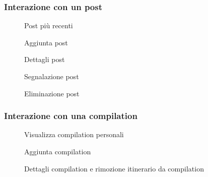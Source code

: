 \documentclass{natourDoc}
\begin{document}
\subsubsection{Interazione con un post}

\begin{figure}[!htbp]
	\centering
	
	\caption{Post più recenti}
\end{figure}
\FloatBarrier

\begin{figure}[!htbp]
	\centering
	
	\caption{Aggiunta post}
\end{figure}
\FloatBarrier

\begin{figure}[!htbp]
	\centering
	
	\caption{Dettagli post}
\end{figure}
\FloatBarrier

\begin{figure}[!htbp]
	\centering
	
	\caption{Segnalazione post}
\end{figure}
\FloatBarrier

\begin{figure}[!htbp]
	\centering
	
	\caption{Eliminazione post}
\end{figure}
\FloatBarrier

\newpage

\subsubsection{Interazione con una compilation}
\begin{figure}[!htbp]
	\centering
	
	\caption{Visualizza compilation personali}
\end{figure}
\FloatBarrier

\begin{figure}[!htbp]
	\centering
	
	\caption{Aggiunta compilation}
\end{figure}
\FloatBarrier

\begin{figure}[!htbp]
	\centering
	
	\caption{Dettagli compilation e rimozione itinerario da compilation}
\end{figure}
\FloatBarrier
\end{document}

